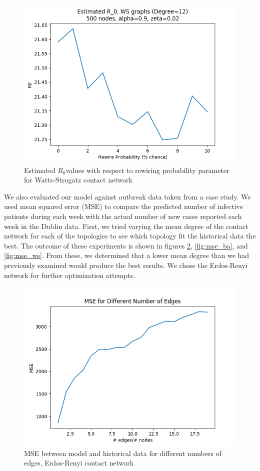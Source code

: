 \documentclass[conference]{IEEEtran}
\newcommand{\ro}{$R_0$}
\begin{document}
\begin{figure}[t]
    \centering
    \includegraphics[scale=0.5]{images/est_r0_ws_rewire.png}
    \caption{Estimated \ro values with respect to rewiring probability parameter for Watts-Strogatz contact network}
    \label{fig:r0_ws_beta}
\end{figure}

We also evaluated our model against outbreak data taken from a case study.\cite{Mcbrein2003} We used mean squared error (MSE) to compare the predicted number of infective patients during each week with the actual number of new cases reported each week in the Dublin data. First, we tried varying the mean degree of the contact network for each of the topologies to see which topology fit the historical data the best. The outcome of these experiments is shown in figures \ref{fig:mse_er}, \ref{fig:mse_ba}, and \ref{fig:mse_ws}. From these, we determined that a lower mean degree than we had previously examined would produce the best results. We chose the Erdos-Renyi network for further optimization attempts.

\begin{figure}[t]
    \centering
    \includegraphics[scale=0.5]{images/mse_er.png}
    \caption{MSE between model and historical data for different numbers of edges, Erdos-Renyi contact network}
    \label{fig:mse_er}
\end{figure}
\end{document}
